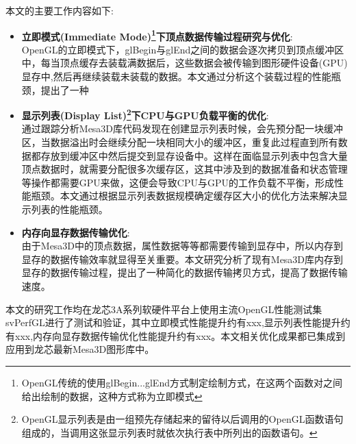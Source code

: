
本文的主要工作内容如下:

\begin{itemize}
\item{\textbf{立即模式(Immediate Mode)\footnote{OpenGL传统的使用glBegin...glEnd方式制定绘制方式，在这两个函数对之间给出绘制的数据，这种方式称为立即模式}下顶点数据传输过程研究与优化}}: \\
OpenGL的立即模式下，glBegin与glEnd之间的数据会逐次拷贝到顶点缓冲区中，每当顶点缓存去装载满数据后，这些数据会被传输到图形硬件设备(GPU)显存中,然后再继续装载未装载的数据。本文通过分析这个装载过程的性能瓶颈，提出了一种
\item{\textbf{显示列表(Display List)\footnote{OpenGL显示列表是由一组预先存储起来的留待以后调用的OpenGL函数语句组成的，当调用这张显示列表时就依次执行表中所列出的函数语句。}下CPU与GPU负载平衡的优化}}: \\
通过跟踪分析Mesa3D库代码发现在创建显示列表时候，会先预分配一块缓冲区，当数据溢出时会继续分配一块相同大小的缓冲区，重复此过程直到所有数据都存放到缓冲区中然后提交到显存设备中。这样在面临显示列表中包含大量顶点数据时，就需要分配很多次缓存区，这其中涉及到的数据准备和状态管理等操作都需要GPU来做，这便会导致CPU与GPU的工作负载不平衡，形成性能瓶颈。本文通过根据显示列表数据规模确定缓存区大小的优化方法来解决显示列表的性能瓶颈。
\item{\textbf{内存向显存数据传输优化}}: \\
由于Mesa3D中的顶点数据，属性数据等等都需要传输到显存中，所以内存到显存的数据传输效率就显得至关重要。本文研究分析了现有Mesa3D库内存到显存的数据传输过程，提出了一种简化的数据传输拷贝方式，提高了数据传输速度。
\end{itemize}



本文的研究工作均在龙芯3A系列软硬件平台上使用主流OpenGL性能测试集svPerfGL进行了测试和验证，其中立即模式性能提升约有xxx,显示列表性能提升约有xxx,内存向显存数据传输优化性能提升约有xxx。本文相关优化成果都已集成到应用到龙芯最新Mesa3D图形库中。
